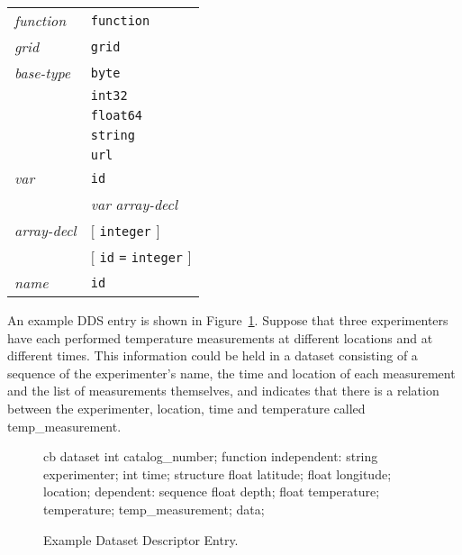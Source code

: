 \begin{table}
\begin{center}
\begin{tabular}{ll}
{\em function\/} & {\tt function} \\

{\em grid\/}    & {\tt grid} \\

{\em base-type\/} & {\tt byte} \\ 
                  & {\tt int32} \\
                  & {\tt float64} \\
                  & {\tt string} \\
                  & {\tt url} \\

{\em var\/}     & {\tt id} \\
                & {\em var} {\em array-decl\/} \\

{\em array-decl\/} & {\tt $[$} {\tt integer} {\tt $]$} \\
                   & {\tt $[$} {\tt id} {\tt =} {\tt integer} {\tt $]$} \\

{\em name\/}    & {\tt id} \\
\end{tabular}
\end{center}
\normalsize
\end{table}

An example DDS entry is shown in Figure~\ref{fig:dds}. Suppose that
three experimenters have each performed temperature measurements at
different locations and at different times. This information could be
held in a dataset consisting of a sequence of the experimenter's
name, the time and location of each measurement and the list of
measurements themselves, and indicates that there is a relation
between the experimenter, location, time and temperature called
temp\_measurement.

\begin{figure}
\begin{code}{cb}
              dataset {
                  int catalog_number;
                  function {
                    independent:
                      string experimenter;
                      int time;
                      structure {
                          float latitude;
                          float longitude;
                      } location;
                    dependent:
                      sequence {
                          float depth;
                          float temperature;
                      } temperature;
                  } temp_measurement;
              } data;
\end{code}
\caption{Example Dataset Descriptor Entry.}
\label{fig:dds}
\end{figure}


